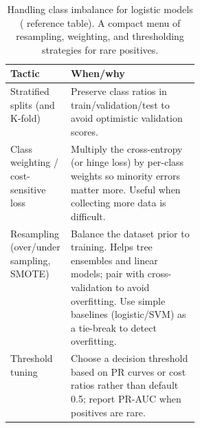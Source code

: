 \begin{table}[tbp]
\centering
\caption{Handling class imbalance for logistic models ( reference table). A compact menu of resampling, weighting, and thresholding strategies for rare positives.}
\begin{tabularx}{0.98\linewidth}{@{}>{\raggedright\arraybackslash}p{0.32\linewidth} >{\raggedright\arraybackslash}X@{}}
\toprule
\textbf{Tactic} & \textbf{When/why} \\
\midrule
Stratified splits (and K-fold) & Preserve class ratios in train/validation/test to avoid optimistic validation scores. \\
Class weighting / cost-sensitive loss & Multiply the cross\hyp{}entropy (or hinge loss) by per-class weights so minority errors matter more. Useful when collecting more data is difficult. \\
Resampling (over/undersampling, SMOTE) & Balance the dataset prior to training. Helps tree ensembles and linear models; pair with cross-validation to avoid overfitting. Use simple baselines (logistic/SVM) as a tie-break to detect overfitting. \\
Threshold tuning & Choose a decision threshold based on PR curves or cost ratios rather than default 0.5; report PR-AUC when positives are rare. \\
\bottomrule
\end{tabularx}
\end{table}

\clearpage

